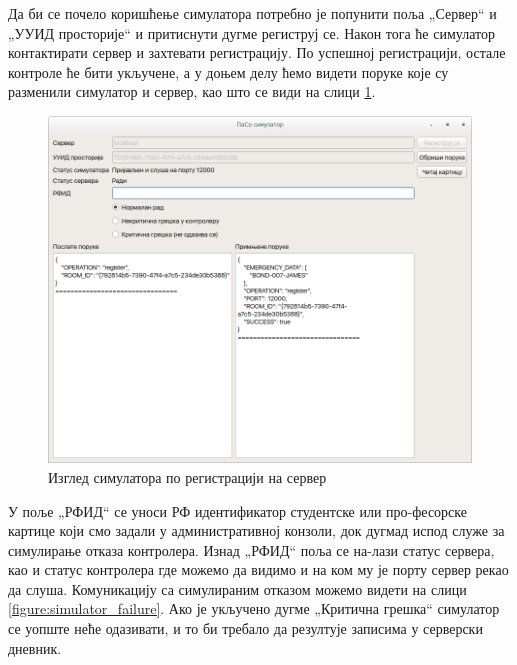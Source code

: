 \documentclass[a4paper, 12pt, diplomski]{etfcyr}
\def\quote#1{„#1“}
\begin{document}
\begin{justify}
				Да би се почело коришћење симулатора потребно је попунити поља \quote{Сервер} и \quote{УУИД просторије} и притиснути дугме региструј се. Након тога ће симулатор контактирати сервер и захтевати регистрацију. По успешној регистрацији, остале контроле ће бити укључене, а у доњем делу ћемо видети поруке које су разменили симулатор и сервер, као што се види на слици \ref{figure:simulator_registered}.
				\begin{figure}[H]
					\begin{center}
						\includegraphics[width=1.0\textwidth]{manual/simulator_registered.png}
					\end{center}
					\caption{Изглед симулатора по регистрацији на сервер}
					\label{figure:simulator_registered}
				\end{figure}
				У поље \quote{РФИД} се уноси РФ идентификатор студентске или про-фесорске картице који смо задали у административној конзоли, док дугмад испод служе за симулирање отказа контролера.
				Изнад \quote{РФИД} поља се на-лази статус сервера, као и статус контролера где можемо да видимо и на ком му је порту сервер рекао да слуша. Комуникацију са симулираним отказом можемо видети на слици \ref{figure:simulator_failure}. Ако је укључено дугме \quote{Критична грешка} симулатор се уопште неће одазивати, и то би требало да резултује записима у серверски дневник.
				\begin{figure}[H]
					\begin{center}

\end{center}
\end{figure}
\end{justify}
\end{document}
